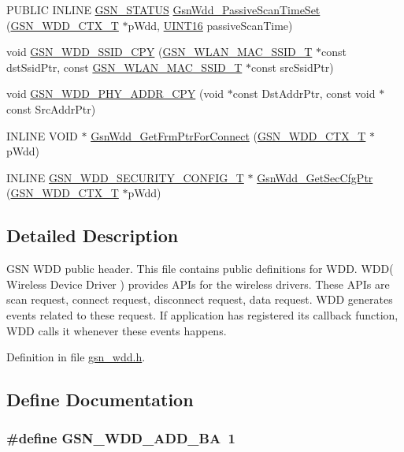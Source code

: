 \begin{DoxyCompactItemize}
PUBLIC INLINE \hyperlink{a00660_gada5951904ac6110b1fa95e51a9ddc217}{GSN\_\-STATUS} \hyperlink{a00603_abe43d60be0ba48f473195c921e3c22f0}{GsnWdd\_\-PassiveScanTimeSet} (\hyperlink{a00108}{GSN\_\-WDD\_\-CTX\_\-T} $\ast$pWdd, \hyperlink{a00660_ga09f1a1fb2293e33483cc8d44aefb1eb1}{UINT16} passiveScanTime)
\item 
void \hyperlink{a00603_a1c6e50232c9b695109cef9e49f65ea21}{GSN\_\-WDD\_\-SSID\_\-CPY} (\hyperlink{a00417}{GSN\_\-WLAN\_\-MAC\_\-SSID\_\-T} $\ast$const dstSsidPtr, const \hyperlink{a00417}{GSN\_\-WLAN\_\-MAC\_\-SSID\_\-T} $\ast$const srcSsidPtr)
\item 
void \hyperlink{a00603_a51907a8dd846daa407ffb8f6048cfbc3}{GSN\_\-WDD\_\-PHY\_\-ADDR\_\-CPY} (void $\ast$const DstAddrPtr, const void $\ast$const SrcAddrPtr)
\item 
INLINE VOID $\ast$ \hyperlink{a00603_a7cba4df1ed7d4eceab1218554e7d0fd5}{GsnWdd\_\-GetFrmPtrForConnect} (\hyperlink{a00108}{GSN\_\-WDD\_\-CTX\_\-T} $\ast$pWdd)
\item 
INLINE \hyperlink{a00297}{GSN\_\-WDD\_\-SECURITY\_\-CONFIG\_\-T} $\ast$ \hyperlink{a00603_a4ffa3e14728ba8f72cdf6c7f12cf0076}{GsnWdd\_\-GetSecCfgPtr} (\hyperlink{a00108}{GSN\_\-WDD\_\-CTX\_\-T} $\ast$pWdd)
\end{DoxyCompactItemize}


\subsection{Detailed Description}
GSN WDD public header. This file contains public definitions for WDD. WDD( Wireless Device Driver ) provides APIs for the wireless drivers. These APIs are scan request, connect request, disconnect request, data request. WDD generates events related to these request. If application has registered its callback function, WDD calls it whenever these events happens. 

Definition in file \hyperlink{a00603_source}{gsn\_\-wdd.h}.



\subsection{Define Documentation}
\hypertarget{a00603_aaa7df45acb072b8008bb24b3e5a8e8b9}{
\subsubsection[{GSN\_\-WDD\_\-ADD\_\-BA}]{\setlength{\rightskip}{0pt plus 5cm}\#define GSN\_\-WDD\_\-ADD\_\-BA~1}}
\label{a00603_aaa7df45acb072b8008bb24b3e5a8e8b9}



